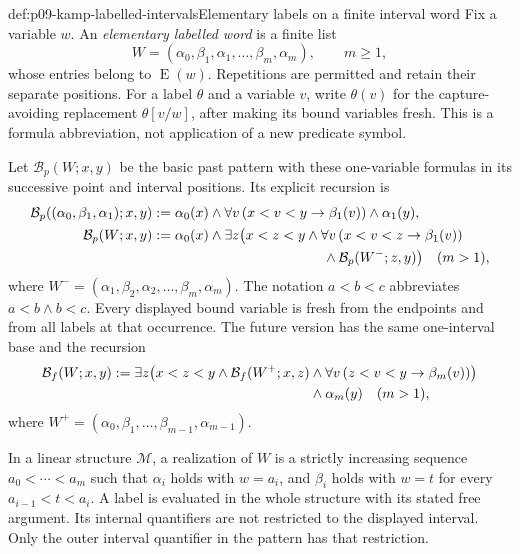 \begin{hbdefinition}{def:p09-kamp-labelled-intervals}{Elementary labels on a finite interval word}
Fix a variable \(w\). An \emph{elementary labelled word} is a finite list
\[
 W=(\alpha_0,\beta_1,\alpha_1,\ldots,\beta_m,\alpha_m),
 \qquad m\geq1,
\]
whose entries belong to \(\operatorname{E}(w)\). Repetitions are
permitted and retain their separate positions. For a label \(\theta\)
and a variable \(v\), write \(\theta(v)\) for the capture-avoiding
replacement \(\theta[v/w]\), after making its bound variables fresh.
This is a formula abbreviation, not application of a new predicate symbol.

Let \(\mathcal B_p(W;x,y)\) be the basic past pattern with these
one-variable formulas in its successive point and interval positions. Its
explicit recursion is
\[
\begin{split}
 \mathcal B_p((\alpha_0,\beta_1,\alpha_1);x,y)
 &\defeq \alpha_0(x)\land
   \forall v\,(x<v<y\to\beta_1(v))\land\alpha_1(y),\\
 \mathcal B_p(W;x,y)
 &\defeq\alpha_0(x)\land\exists z\bigl(x<z<y\land
   \forall v\,(x<v<z\to\beta_1(v))\\
 &\hspace{43mm}{}\land\mathcal B_p(W^-;z,y)\bigr)\quad(m>1),
\end{split}
\]
where \(W^-=(\alpha_1,\beta_2,\alpha_2,\ldots,\beta_m,\alpha_m)\).
The notation \(a<b<c\) abbreviates \(a<b\land b<c\).
Every displayed bound variable is fresh from the endpoints and from all
labels at that occurrence. The future version has the same one-interval
base and the recursion
\[
\begin{split}
 \mathcal B_f(W;x,y)\mathrel{:=}
 \exists z\bigl(x<z<y\land\mathcal B_f(W^+;x,z)
 &\land\forall v\,(z<v<y\to\beta_m(v))\bigr)\\
 &{}\land\alpha_m(y)\quad(m>1),
\end{split}
\]
where \(W^+=(\alpha_0,\beta_1,\ldots,\beta_{m-1},\alpha_{m-1})\).

In a linear structure \(\mathcal M\), a realization of \(W\) is a
strictly increasing sequence \(a_0<\cdots<a_m\) such that
\(\alpha_i\) holds with \(w=a_i\), and \(\beta_i\) holds with
\(w=t\) for every \(a_{i-1}<t<a_i\). A label is evaluated in the
whole structure with its stated free argument. Its internal quantifiers
are not restricted to the displayed interval. Only the outer interval
quantifier in the pattern has that restriction.
\end{hbdefinition}

